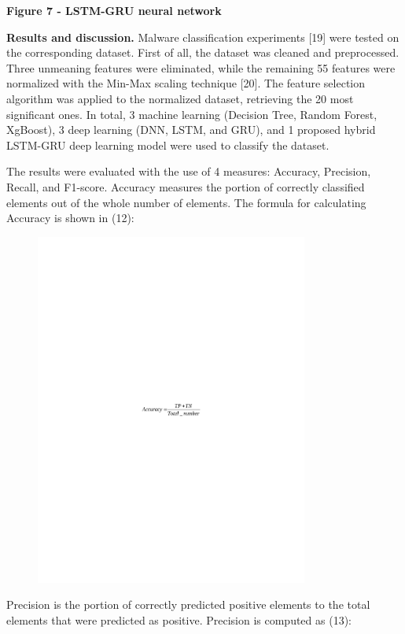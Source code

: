 {\bfseries Figure 7 - LSTM-GRU neural network}

{\bfseries Results and discussion.} Malware classification experiments
{[}19{]} were tested on the corresponding dataset. First of all, the
dataset was cleaned and preprocessed. Three unmeaning features were
eliminated, while the remaining 55 features were normalized with the
Min-Max scaling technique {[}20{]}. The feature selection algorithm was
applied to the normalized dataset, retrieving the 20 most significant
ones. In total, 3 machine learning (Decision Tree, Random Forest,
XgBoost), 3 deep learning (DNN, LSTM, and GRU), and 1 proposed hybrid
LSTM-GRU deep learning model were used to classify the dataset.

The results were evaluated with the use of 4 measures: Accuracy,
Precision, Recall, and F1-score. Accuracy measures the portion of
correctly classified elements out of the whole number of elements. The
formula for calculating Accuracy is shown in (12):

\begin{figure}[H]
	\centering
	\includegraphics[width=0.8\textwidth]{media/ict/image81}
	\caption*{}
\end{figure}


Precision is the portion of correctly predicted positive elements to the
total elements that were predicted as positive. Precision is computed as
(13):

